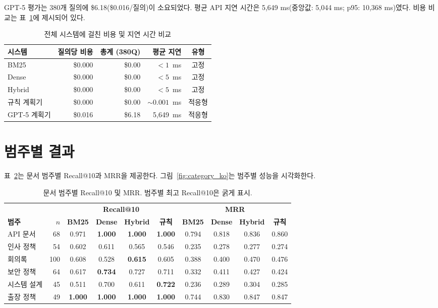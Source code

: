 GPT-5 평가는 380개 질의에 \$6.18(\$0.016/질의)이 소요되었다. 평균 API 지연 시간은 5,649 ms(중앙값: 5,044 ms; p95: 10,368 ms)였다. 비용 비교는 표~\ref{tab:cost_latency_ko}에 제시되어 있다.

\begin{table}[htbp]
\centering
\caption{전체 시스템에 걸친 비용 및 지연 시간 비교}
\label{tab:cost_latency_ko}
\begin{tabular}{lrrrc}
\toprule
\textbf{시스템} & \textbf{질의당 비용} & \textbf{총계 (380Q)} & \textbf{평균 지연} & \textbf{유형} \\
\midrule
BM25            & \$0.000 & \$0.00 & ${<}1$~ms & 고정 \\
Dense           & \$0.000 & \$0.00 & ${<}5$~ms & 고정 \\
Hybrid          & \$0.000 & \$0.00 & ${<}5$~ms & 고정 \\
규칙 계획기     & \$0.000 & \$0.00 & ${\sim}0.001$~ms & 적응형 \\
GPT-5 계획기    & \$0.016 & \$6.18 & 5{,}649~ms & 적응형 \\
\bottomrule
\end{tabular}
\end{table}

\FloatBarrier
\section{범주별 결과}
\label{sec:results_category_ko}

표~\ref{tab:category_ko}는 문서 범주별 Recall@10과 MRR을 제공한다. 그림~\ref{fig:category_ko}는 범주별 성능을 시각화한다.

\begin{table}[htbp]
\centering
\caption{문서 범주별 Recall@10 및 MRR. 범주별 최고 Recall@10은 굵게 표시.}
\label{tab:category_ko}
\begin{tabular}{lrcccccccc}
\toprule
 & & \multicolumn{4}{c}{\textbf{Recall@10}} & \multicolumn{4}{c}{\textbf{MRR}} \\
\cmidrule(lr){3-6}\cmidrule(lr){7-10}
\textbf{범주} & \textbf{$n$} & \textbf{BM25} & \textbf{Dense} & \textbf{Hybrid} & \textbf{규칙} & \textbf{BM25} & \textbf{Dense} & \textbf{Hybrid} & \textbf{규칙} \\
\midrule
API 문서     & 68  & 0.971 & \textbf{1.000} & \textbf{1.000} & \textbf{1.000} & 0.794 & 0.818 & 0.836 & 0.860 \\
인사 정책    & 54  & 0.602 & 0.611 & 0.565 & 0.546 & 0.235 & 0.278 & 0.277 & 0.274 \\
회의록       & 100 & 0.608 & 0.528 & \textbf{0.615} & 0.605 & 0.388 & 0.400 & 0.470 & 0.476 \\
보안 정책    & 64  & 0.617 & \textbf{0.734} & 0.727 & 0.711 & 0.332 & 0.411 & 0.427 & 0.424 \\
시스템 설계  & 45  & 0.511 & 0.700 & 0.611 & \textbf{0.722} & 0.236 & 0.289 & 0.304 & 0.285 \\
출장 정책    & 49  & \textbf{1.000} & \textbf{1.000} & \textbf{1.000} & \textbf{1.000} & 0.744 & 0.830 & 0.847 & 0.847 \\
\bottomrule
\end{tabular}
\end{table}

